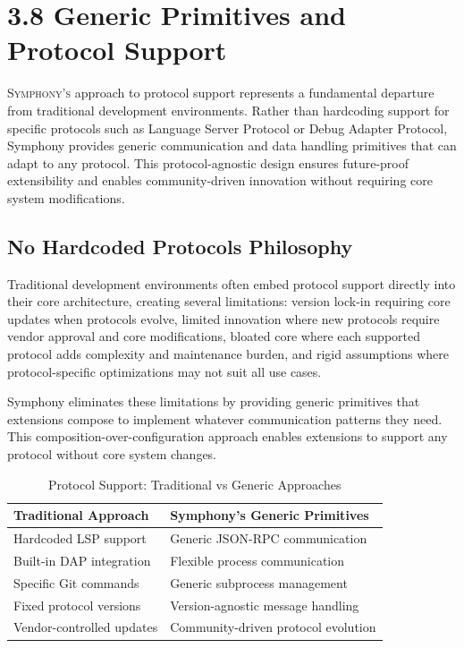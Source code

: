 
\section{3.8 Generic Primitives and Protocol Support}
\label{sec:generic-primitives}

\lettrine{S}{ymphony's} approach to protocol support represents a fundamental departure from traditional development environments. Rather than hardcoding support for specific protocols such as Language Server Protocol or Debug Adapter Protocol, Symphony provides generic communication and data handling primitives that can adapt to any protocol. This protocol-agnostic design ensures future-proof extensibility and enables community-driven innovation without requiring core system modifications.

\subsection*{No Hardcoded Protocols Philosophy}

Traditional development environments often embed protocol support directly into their core architecture, creating several limitations: version lock-in requiring core updates when protocols evolve, limited innovation where new protocols require vendor approval and core modifications, bloated core where each supported protocol adds complexity and maintenance burden, and rigid assumptions where protocol-specific optimizations may not suit all use cases.

Symphony eliminates these limitations by providing generic primitives that extensions compose to implement whatever communication patterns they need. This composition-over-configuration approach enables extensions to support any protocol without core system changes.

\begin{table}[H]
\caption{Protocol Support: Traditional vs Generic Approaches}
\centering
\begin{tabular}{@{}p{}p{}@{}}
\toprule
\textbf{Traditional Approach} & \textbf{Symphony's Generic Primitives} \\
\midrule
Hardcoded LSP support & Generic JSON-RPC communication \\
Built-in DAP integration & Flexible process communication \\
Specific Git commands & Generic subprocess management \\
Fixed protocol versions & Version-agnostic message handling \\
Vendor-controlled updates & Community-driven protocol evolution \\
\bottomrule
\end{tabular}
\end{table}

